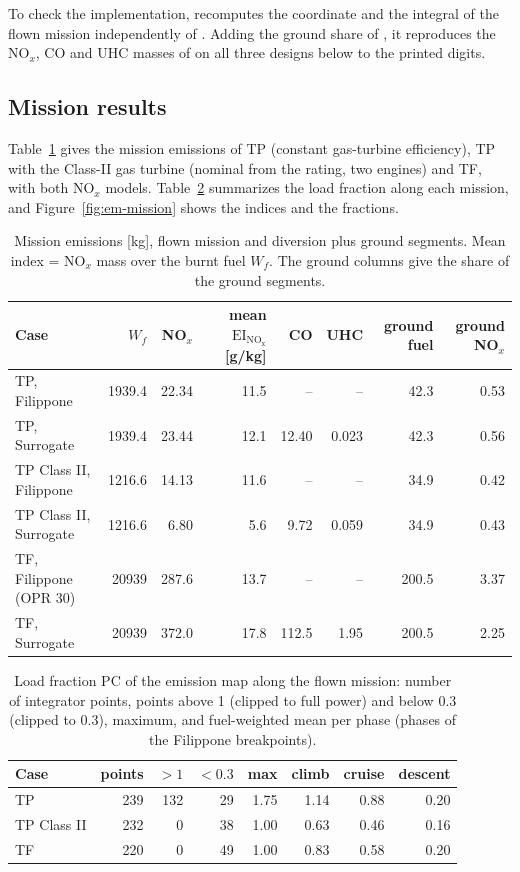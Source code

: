 \documentclass[a4paper,11pt]{article}
\newcommand{\EI}[1]{\mathrm{EI}_{\mathrm{#1}}}
\begin{document}
To check the implementation,  recomputes the coordinate and the
integral of the flown mission independently of . Adding the ground share of
, it reproduces the NO$_x$, CO and UHC masses of  on
all three designs below to the printed digits.

\subsection{Mission results}\label{sec:em-mission}
Table~\ref{tab:em-mission} gives the mission emissions of TP (constant gas-turbine efficiency),
TP with the Class-II gas turbine (nominal from the rating, two engines) and TF, with both NO$_x$
models. Table~\ref{tab:em-fraction} summarizes the load fraction along each mission, and
Figure~\ref{fig:em-mission} shows the indices and the fractions.

\begin{table}[htbp]
\centering\small
\caption{Mission emissions [kg], flown mission and diversion plus ground segments. Mean index =
NO$_x$ mass over the burnt fuel $W_f$. The ground columns give the share of the ground
segments.}\label{tab:em-mission}
\setlength{\tabcolsep}{4pt}
\begin{tabular}{@{}lrrrrrrr@{}}
\toprule
Case & $W_f$ & NO$_x$ & mean $\EI{NO_x}$ [g/kg] & CO & UHC & ground fuel & ground NO$_x$ \\
\midrule
TP, Filippone & \num{1939.4} & 22.34 & 11.5 & -- & -- & 42.3 & 0.53 \\
TP, Surrogate & \num{1939.4} & 23.44 & 12.1 & 12.40 & 0.023 & 42.3 & 0.56 \\
TP Class II, Filippone & \num{1216.6} & 14.13 & 11.6 & -- & -- & 34.9 & 0.42 \\
TP Class II, Surrogate & \num{1216.6} & 6.80 & 5.6 & 9.72 & 0.059 & 34.9 & 0.43 \\
TF, Filippone (OPR 30) & \num{20939} & 287.6 & 13.7 & -- & -- & 200.5 & 3.37 \\
TF, Surrogate & \num{20939} & 372.0 & 17.8 & 112.5 & 1.95 & 200.5 & 2.25 \\
\bottomrule
\end{tabular}
\end{table}

\begin{table}[htbp]
\centering\small
\caption{Load fraction PC of the emission map along the flown mission: number of integrator
points, points above 1 (clipped to full power) and below 0.3 (clipped to 0.3), maximum, and
fuel-weighted mean per phase (phases of the Filippone breakpoints).}\label{tab:em-fraction}
\begin{tabular}{@{}lrrrrrrr@{}}
\toprule
Case & points & $>1$ & $<0.3$ & max & climb & cruise & descent \\
\midrule
TP & 239 & 132 & 29 & 1.75 & 1.14 & 0.88 & 0.20 \\
TP Class II & 232 & 0 & 38 & 1.00 & 0.63 & 0.46 & 0.16 \\
TF & 220 & 0 & 49 & 1.00 & 0.83 & 0.58 & 0.20 \\
\bottomrule
\end{tabular}
\end{table}
\end{document}
